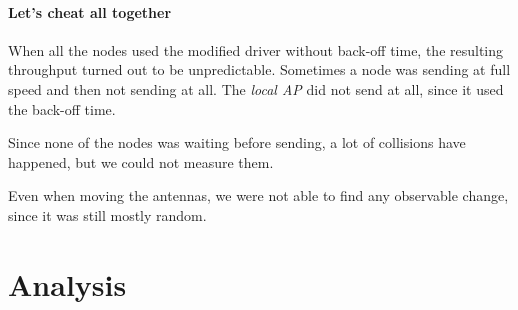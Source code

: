 \documentclass[12pt,a4paper]{article}
\begin{document}
\paragraph{Let's cheat all together}
When all the nodes used the modified driver without back-off time, the resulting throughput turned out to be unpredictable. Sometimes a node was sending at full speed and then not sending at all. The \emph{local AP} did not send at all, since it used the back-off time.

Since none of the nodes was waiting before sending, a lot of collisions have happened, but we could not measure them.

Even when moving the antennas, we were not able to find any observable change, since it was still mostly random.
\section{Analysis}


\end{document}
